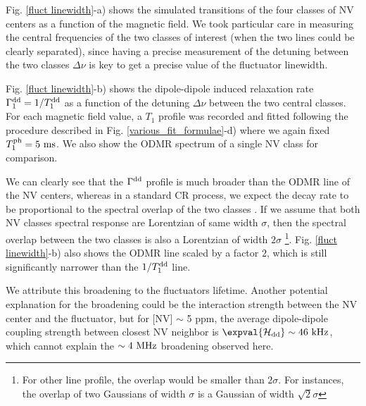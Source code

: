 \documentclass[a4paper, 11pt]{book}
\begin{document}
Fig. \ref{fluct linewidth}-a) shows the simulated transitions of the four classes of NV centers as a function of the magnetic field. We took particular care in measuring the central frequencies of the two classes of interest (when the two lines could be clearly separated), since having a precise measurement of the detuning between the two classes $\Delta \nu$ is key to get a precise value of the fluctuator linewidth.

Fig. \ref{fluct linewidth}-b) shows the dipole-dipole induced relaxation rate $\Gamma_1^{\rm dd}=1/T_1^{\rm dd}$ as a function of the detuning $\Delta \nu$ between the two central classes. For each magnetic field value, a $T_1$ profile was recorded and fitted following the procedure described in Fig. \ref{various_fit_formulae}-d) where we again fixed $T_1^{\rm ph}=5\ \rm ms$. We also show the ODMR spectrum of a single NV class for comparison.

We can clearly see that the $\Gamma^{\rm dd}$ profile is much broader than the ODMR line of the NV centers, whereas in a standard CR process, we expect the decay rate to be proportional to the spectral overlap of the two classes \citep{hall2016detection}. If we assume that both NV classes spectral response are Lorentzian of same width $\sigma$, then the spectral overlap between the two classes is also a Lorentzian of width $2 \sigma$ \footnote{For other line profile, the overlap would be smaller than $2 \sigma$. For instances, the overlap of two Gaussians of width $\sigma$ is a Gaussian of width $\sqrt{2} \sigma$}. Fig. \ref{fluct linewidth}-b) also shows the ODMR line scaled by a factor $2$, which is still significantly narrower than the $1/T_1^{\rm dd}$ line.

We attribute this broadening to the fluctuators lifetime. Another potential explanation for the broadening could be the interaction strength between the NV center and the fluctuator, but for [NV] $\sim$ 5 ppm, the average dipole-dipole coupling strength between closest NV neighbor is $\expval{\mathcal{H}_{\rm dd}} \sim 46\ \rm kHz$, which cannot explain the $\sim 4\ \rm MHz$ broadening observed here.
\end{document}
